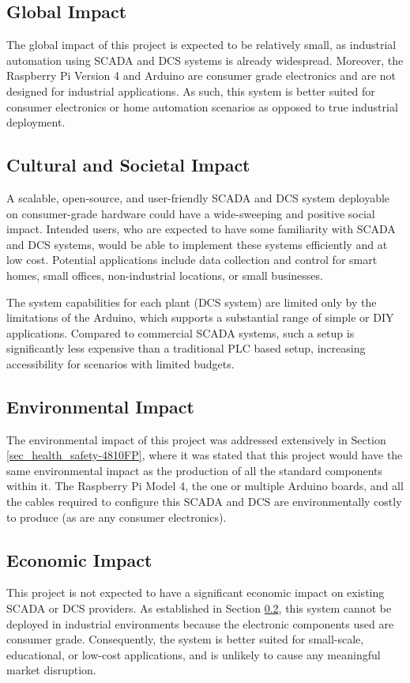 \documentclass[../main.tex]{subfiles}
\begin{document}
\subsection{Global Impact}
The global impact of this project is expected to be relatively small, as industrial automation using SCADA and DCS systems is already widespread. Moreover, the Raspberry Pi Version 4 and Arduino are consumer grade electronics and are not designed for industrial applications. As such, this system is better suited for consumer electronics or home automation scenarios as opposed to true industrial deployment.

\subsection{Cultural and Societal Impact}\label{subsec_societal_imp-4810FP}
A scalable, open-source, and user-friendly SCADA and DCS system deployable on consumer-grade hardware could have a wide-sweeping and positive social impact. Intended users, who are expected to have some familiarity with SCADA and DCS systems, would be able to implement these systems efficiently and at low cost. Potential applications include data collection and control for smart homes, small offices, non-industrial locations, or small businesses. 

\par The system capabilities for each plant (DCS system) are limited only by the limitations of the Arduino, which supports a substantial range of simple or DIY applications. Compared to commercial SCADA systems, such a setup is significantly less expensive than a traditional PLC based setup, increasing accessibility for scenarios with limited budgets.

\subsection{Environmental Impact}
The environmental impact of this project was addressed extensively in Section \ref{sec_health_safety-4810FP}, where it was stated that this project would have the same environmental impact as the production of all the standard components within it. The Raspberry Pi Model 4, the one or multiple Arduino boards, and all the cables required to configure this SCADA and DCS are environmentally costly to produce (as are any consumer electronics).

\subsection{Economic Impact}
\par This project is not expected to have a significant economic impact on existing SCADA or DCS providers. As established in Section \ref{subsec_societal_imp-4810FP}, this system cannot be deployed in industrial environments because the electronic components used are consumer grade. Consequently, the system is better suited for small-scale, educational, or low-cost applications, and is unlikely to cause any meaningful market disruption.
\end{document}
